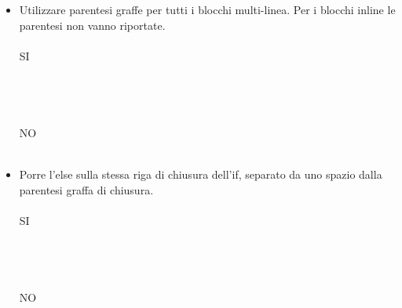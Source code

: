 \begin{itemize}
    \item Utilizzare parentesi graffe per tutti i blocchi multi-linea. Per i blocchi inline le parentesi non vanno riportate.\\ \\
    SI\\ \\ \\ \\ \\
    NO\\ \\    
    \item Porre l'else sulla stessa riga di chiusura dell'if, separato da uno spazio dalla parentesi graffa di chiusura.\\ \\
    SI\\ \\ \\ \\ \\
    NO\\ \\ 
\end{itemize}
